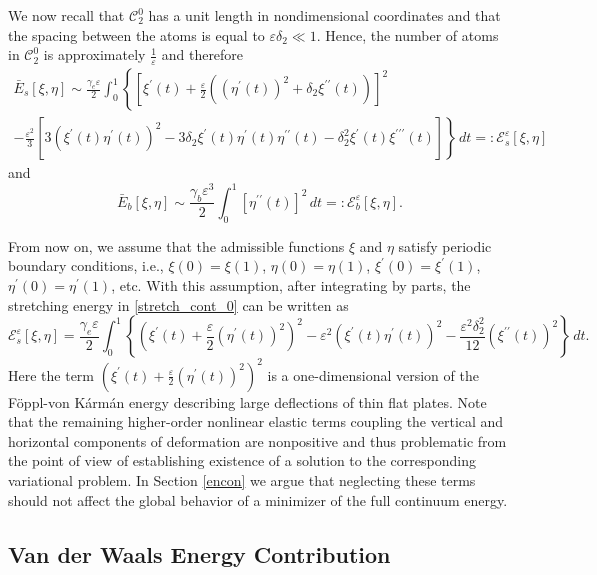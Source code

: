 \documentclass{siamltex}
\newcommand{\eps}{\varepsilon}
\begin{document}
We now recall that $\mathcal C_2^0$ has a unit length in nondimensional coordinates and that the spacing between the atoms is equal to $\eps\delta_2\ll1$. Hence, the number of atoms in $\mathcal C_2^0$ is approximately $\frac1\eps$ and therefore 
\begin{multline}
\label{stretch_cont_0}
\bar E_s[\xi,\eta]\sim\frac{\gamma_e\eps}{2}\int_0^1 \left\{{\left[\xi^\prime(t)+\frac{\eps}{2}\left({\left(\eta^\prime(t)\right)}^2+\delta_2\xi^{\prime\prime}(t)\right)\right]}^2\right.\\\left.-\frac{\eps^2}{3}\left[3{\left(\xi^\prime(t)\eta^\prime(t)\right)}^2-3\delta_2\xi^\prime(t)\eta^\prime(t)\eta^{\prime\prime}(t)-\delta_2^2\xi^\prime(t)\xi^{\prime\prime\prime}(t)\right]\right\}\,dt=:\mathcal E_s^\eps[\xi,\eta]
\end{multline}
and
\begin{equation}
\label{bend_cont}
\bar E_b[\xi,\eta]\sim\frac{\gamma_b\eps^3}{2}\int_0^1 {\left[\eta^{\prime\prime}(t)\right]}^2\,dt=:\mathcal E_b^\eps[\xi,\eta].
\end{equation}

From now on, we assume that the admissible functions $\xi$ and $\eta$ satisfy periodic boundary conditions, i.e., $\xi(0)=\xi(1)$, $\eta(0)=\eta(1)$, $\xi^\prime(0)=\xi^\prime(1)$, $\eta^\prime(0)=\eta^\prime(1)$, etc. With this assumption, after integrating by parts, the stretching energy in \eqref{stretch_cont_0} can be written as 
\begin{equation}
\label{stretch_cont}
\mathcal E_s^\eps[\xi,\eta]=\frac{\gamma_e\eps}{2}\int_0^1 \left\{{\left(\xi^\prime(t)+\frac{\eps}{2}{\left(\eta^\prime(t)\right)}^2\right)}^2-\eps^2{\left(\xi^\prime(t)\eta^\prime(t)\right)}^2-\frac{\eps^2\delta_2^2}{12}{\left(\xi^{\prime\prime}(t)\right)}^2\right\}\,dt.
\end{equation}
{Here the term ${\left(\xi^\prime(t)+\frac{\eps}{2}{\left(\eta^\prime(t)\right)}^2\right)}^2$ is a one-dimensional version of the F\"oppl-von K\'arm\'an energy describing large deflections of thin flat plates. Note that the remaining higher-order nonlinear elastic terms coupling the vertical and horizontal components of deformation are nonpositive and thus problematic from the point of view of establishing existence of a solution to the corresponding variational problem. In Section \ref{encon} we argue that neglecting these terms should not affect the global behavior of a minimizer of the full continuum energy.}

 \subsection{Van der Waals Energy Contribution} \label{vaencon}
\end{document}
